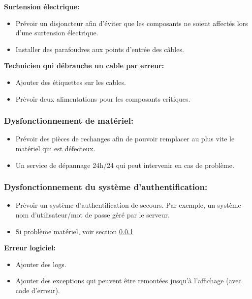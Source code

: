 \documentclass[12pt]{article}
\begin{document}
\textbf{Surtension électrique:} \label{surtension-elec}
\justify
\begin{itemize}
	\item Prévoir un disjoncteur afin d'éviter que les composants ne soient affectés lors d'une surtension électrique.
	\item Installer des parafoudres aux points d'entrée des câbles.\\
\end{itemize}

\textbf{Technicien qui débranche un cable par erreur:}
\justify
\begin{itemize}
	\item Ajouter des étiquettes sur les cables.
	\item Prévoir deux alimentations pour les composants critiques.
\end{itemize}

\subsubsection{Dysfonctionnement de matériel:} \label{dysf-mat}
\justify
\begin{itemize}
	\item Prévoir des pièces de rechanges afin de pouvoir remplacer au plus vite le matériel qui est défecteux.
	\item Un service de dépannage 24h/24 qui peut intervenir en cas de problème.
\end{itemize}

\subsubsection{Dysfonctionnement du système d'authentification:} \label{dysf-auth}
\justify
\begin{itemize}
	\item Prévoir un système d'authentification de secours. Par exemple, un système nom d'utilisateur/mot de passe géré par le serveur.
	\item Si problème matériel, voir section \ref{dysf-mat} \\
	
\end{itemize}

\textbf{Erreur logiciel:}
\justify
\begin{itemize}
	\item Ajouter des logs.
	\item Ajouter des exceptions qui peuvent être remontées jusqu'à l'affichage (avec code d'erreur).\\
\end{itemize}
\end{document}
